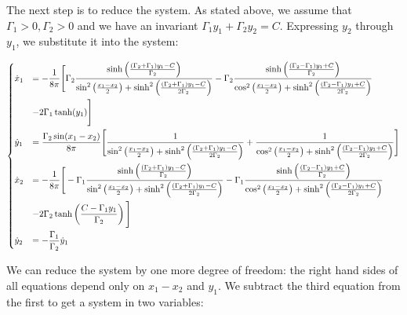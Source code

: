 \documentclass[11pt,twoside]{article}
\theoremstyle{definition}
\numberwithin{equation}{section}
\begin{document}
The next step is to reduce the system. As stated above, we assume that $\Gamma_1>0,\Gamma_2>0$ and we have an invariant $\Gamma_1y_1+\Gamma_2y_2= C$. Expressing $y_2$ through $y_1$, we substitute it into the system:
\begin{footnotesize}
\begin{equation}
\label{eq: system 2 pv with gammas}
    \begin{dcases}
    \dot{x}_1  &= -\frac{1}{8\pi}\Bigg[\Gamma_2\frac{\sinh\left(\frac{(\Gamma_2+\Gamma_1)y_1-C}{\Gamma_2}\right)}{\sin^2\left(\frac{x_1-x_2}{2}\right) + \sinh^2\left(\frac{(\Gamma_2+\Gamma_1)y_1-C}{2\Gamma_2}\right)}  -  \Gamma_2 \frac{\sinh\left(\frac{(\Gamma_2-\Gamma_1)y_1+C}{\Gamma_2}\right)}{\cos^2\left(\frac{x_1-x_2}{2}\right)+ \sinh^2\left(\frac{(\Gamma_2-\Gamma_1)y_1+C}{2\Gamma_2}\right)}\\&- 2\Gamma_1\tanh(y_1)\Bigg]\\
\dot{y}_1 &= \frac{\Gamma_2\sin(x_1-x_2)}{8\pi} \Biggl[\frac{1}{\sin^2\left(\frac{x_1-x_2}{2}\right) + \sinh^2\left(\frac{(\Gamma_2+\Gamma_1)y_1- C}{2\Gamma_2}\right)} + \frac{1}{\cos^2\left(\frac{x_1-x_2}{2}\right)+ \sinh^2\left(\frac{(\Gamma_2-\Gamma_1)y_1+ C}{2\Gamma_2}\right)}\Biggr]\\
        \dot{x}_2 &= -\frac{1}{8\pi}\Bigg[-\Gamma_1\frac{\sinh\left(\frac{(\Gamma_2+\Gamma_1)y_1-C}{\Gamma_2}\right)}{\sin^2\left(\frac{x_1-x_2}{2}\right) + \sinh^2\left(\frac{(\Gamma_2+\Gamma_1)y_1-C}{2\Gamma_2}\right)} - \Gamma_1 \frac{\sinh\left(\frac{(\Gamma_2-\Gamma_1)y_1+ C}{\Gamma_2}\right)}{\cos^2\left(\frac{x_1-x_2}{2}\right)+ \sinh^2\left(\frac{(\Gamma_2-\Gamma_1)y_1+ C}{2\Gamma_2}\right)}\\&- 2\Gamma_2\tanh\left(\frac{C-\Gamma_1y_1}{\Gamma_2}\right)\Bigg]\\
        \dot{y}_2 &= -\frac{\Gamma_1}{\Gamma_2}\dot{y}_1
        \end{dcases}
        \end{equation}

\end{footnotesize}

    We can reduce the system by one more degree of freedom: the right hand sides of all equations depend only on $x_1-x_2$ and $y_1$. We subtract the third equation from the first to get a system in two variables:
    
\end{document}
